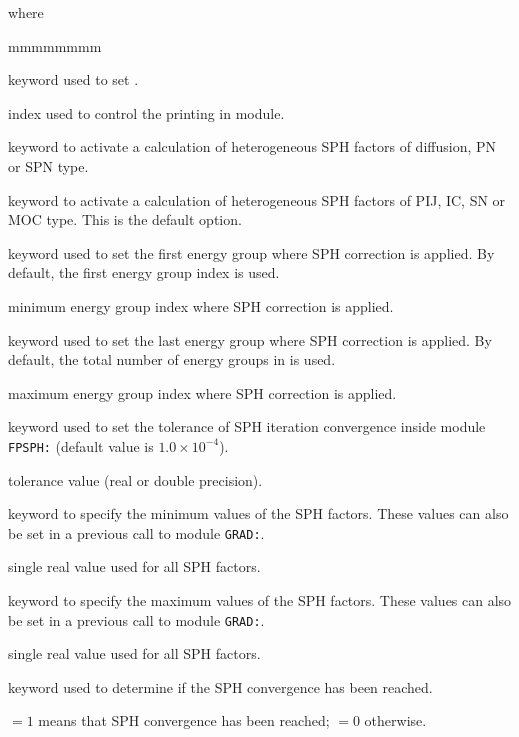 \noindent where
\begin{ListeDeDescription}{mmmmmmmm}

\item[\moc{EDIT}] keyword used to set .

\item[\dusa{iprint}] index used to control the printing in module.

\item[\moc{PN}] keyword to activate a calculation of heterogeneous SPH factors of diffusion, PN or SPN type.

\item[\moc{SN}] keyword to activate a calculation of heterogeneous SPH factors of PIJ, IC, SN or MOC type.
This is the default option.

\item[\moc{GRPMIN}] keyword used to set the first energy group where SPH correction is applied. By default,
the first energy group index is used.

\item[\dusa{ngr1}] minimum energy group index where SPH correction is applied.

\item[\moc{GRPMAX}] keyword used to set the last energy group where SPH correction is applied. By default,
the total number of energy groups in  is used.

\item[\dusa{ngr2}] maximum energy group index where SPH correction is applied.

\item[\moc{OUT-STEP-EPS}] keyword used to set the tolerance of SPH iteration convergence inside module {\tt FPSPH:} (default value
is $1.0 \times 10^{-4}$).

\item[\dusa{$\epsilon_{ext}$}] tolerance value (real or double precision).

\item[\moc{VAR-VAL-MIN}] keyword to specify the minimum values of the SPH factors. These values can also be set in a previous call
to module {\tt GRAD:}.

\item[\dusa{varmin}] single real value used for all SPH factors.

\item[\moc{VAR-VAL-MAX}] keyword to specify the maximum values of the SPH factors. These values can also be set in a previous call
to module {\tt GRAD:}.

\item[\dusa{varmax}] single real value used for all SPH factors.

\item[\moc{OUT-CONV-TST}] keyword used to determine if the SPH convergence has been reached.

\item[\dusa{$l_{conv}$}] $=1$ means that SPH convergence has been reached; $=0$ otherwise.

\end{ListeDeDescription}
\clearpage
